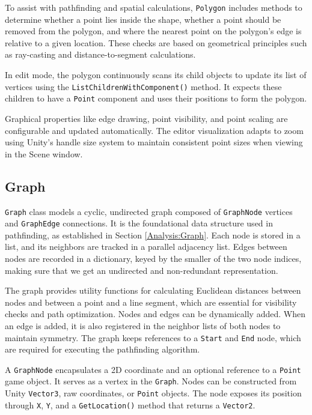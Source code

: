 To assist with pathfinding and spatial calculations, \verb|Polygon| includes methods to determine whether a point lies inside the shape, whether a point should be removed from the polygon, and where the nearest point on the polygon's edge is relative to a given location. These checks are based on geometrical principles such as ray-casting and distance-to-segment calculations.

In edit mode, the polygon continuously scans its child objects to update its list of vertices using the \verb|ListChildrenWithComponent()| method. It expects these children to have a \verb|Point| component and uses their positions to form the polygon.

Graphical properties like edge drawing, point visibility, and point scaling are configurable and updated automatically. The editor visualization adapts to zoom using Unity’s handle size system to maintain consistent point sizes when viewing in the Scene window.


\subsection{Graph}
\verb|Graph| class models a cyclic, undirected graph composed of \verb|GraphNode| vertices and \verb|GraphEdge| connections. It is the foundational data structure used in pathfinding, as established in Section \ref{Analysis:Graph}. Each node is stored in a list, and its neighbors are tracked in a parallel adjacency list. Edges between nodes are recorded in a dictionary, keyed by the smaller of the two node indices, making sure that we get an undirected and non-redundant representation.

The graph provides utility functions for calculating Euclidean distances between nodes and between a point and a line segment, which are essential for visibility checks and path optimization. Nodes and edges can be dynamically added. When an edge is added, it is also registered in the neighbor lists of both nodes to maintain symmetry. The graph keeps references to a \verb|Start| and \verb|End| node, which are required for executing the pathfinding algorithm.

 A \verb|GraphNode| encapsulates a 2D coordinate and an optional reference to a \verb|Point| game object. It serves as a vertex in the \verb|Graph|. Nodes can be constructed from Unity \verb|Vector3|, raw coordinates, or \verb|Point| objects. The node exposes its position through \verb|X|, \verb|Y|, and a \verb|GetLocation()| method that returns a \verb|Vector2|.

